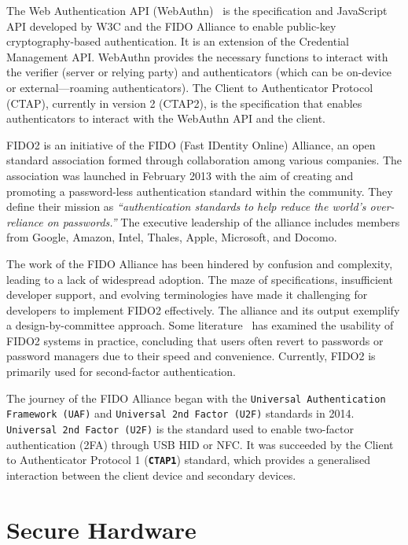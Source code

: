 The Web Authentication API (WebAuthn)~\cite{noauthor_web_2021} is the specification and JavaScript API developed by W3C and the FIDO Alliance to enable public-key cryptography-based authentication. It is an extension of the Credential Management API. WebAuthn provides the necessary functions to interact with the verifier (server or relying party) and authenticators (which can be on-device or external—roaming authenticators). The Client to Authenticator Protocol (CTAP), currently in version 2 (CTAP2), is the specification that enables authenticators to interact with the WebAuthn API and the client.

FIDO2 is an initiative of the FIDO (Fast IDentity Online) Alliance, an open standard association formed through collaboration among various companies. The association was launched in February 2013 with the aim of creating and promoting a password-less authentication standard within the community. They define their mission as \textit{``authentication standards to help reduce the world's over-reliance on passwords.''} The executive leadership of the alliance includes members from Google, Amazon, Intel, Thales, Apple, Microsoft, and Docomo.

The work of the FIDO Alliance has been hindered by confusion and complexity, leading to a lack of widespread adoption. The maze of specifications, insufficient developer support, and evolving terminologies have made it challenging for developers to implement FIDO2 effectively. The alliance and its output exemplify a design-by-committee approach. Some literature~\cite{farke_you_2020, ghorbani_lyastani_is_2020} has examined the usability of FIDO2 systems in practice, concluding that users often revert to passwords or password managers due to their speed and convenience. Currently, FIDO2 is primarily used for second-factor authentication.

The journey of the FIDO Alliance began with the \texttt{Universal Authentication Framework (UAF)} and \texttt{Universal 2nd Factor (U2F)} standards in 2014. \texttt{Universal 2nd Factor (U2F)} is the standard used to enable two-factor authentication (2FA) through USB HID or NFC. It was succeeded by the Client to Authenticator Protocol 1 (\textbf{\texttt{CTAP1}}) standard, which provides a generalised interaction between the client device and secondary devices.


\section{Secure Hardware}
\label{sec::chp2::secure_hardware}

